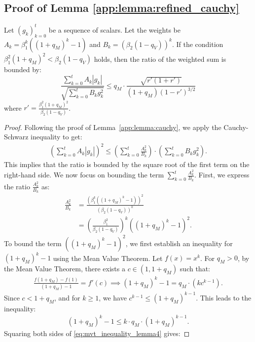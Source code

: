 \documentclass[11pt, letterpaper]{article}
\begin{document}
\subsection{Proof of Lemma \ref{app:lemma:refined_cauchy}}
\begin{lemma}
\label{app:lemma:refined_cauchy}
Let \((g_k)_{k=0}^t\) be a sequence of scalars. Let the weights be $A_k = \beta_1^k((1+q_M)^k - 1)$ and $B_k = (\beta_2(1-q_V))^k$.
If the condition $\beta_1^2(1+q_M)^2 < \beta_2(1-q_V)$ holds, then the ratio of the weighted sum is bounded by:
$$ \frac{\sum_{k=0}^{t} A_k |g_k|}{\sqrt{\sum_{k=0}^{t} B_k g_k^2}} \le q_M \cdot \frac{\sqrt{r'(1+r')}}{(1+q_M)(1-r')^{3/2}} $$
where $r' = \frac{\beta_1^2(1+q_M)^2}{\beta_2(1-q_V)}$.
\end{lemma}
\begin{proof}
Following the proof of Lemma~\ref{app:lemma:cauchy}, we apply the Cauchy-Schwarz inequality to get:
\begin{align}
\left(\sum_{k=0}^{t} A_k |g_k|\right)^2 \le \left( \sum_{k=0}^{t} \frac{A_k^2}{B_k} \right) \cdot \left( \sum_{k=0}^{t} B_k g_k^2 \right). \label{eq:cauchy_applied_lemma4}
\end{align}
This implies that the ratio is bounded by the square root of the first term on the right-hand side. We now focus on bounding the term $\sum_{k=0}^{t} \frac{A_k^2}{B_k}$. First, we express the ratio $\frac{A_k^2}{B_k}$ as:
\begin{align}
\frac{A_k^2}{B_k} &= \frac{(\beta_1^k((1+q_M)^k - 1))^2}{(\beta_2(1-q_V))^k} \nonumber \\
&= \left(\frac{\beta_1^2}{\beta_2(1-q_V)}\right)^k ((1+q_M)^k-1)^2. \label{eq:ak_bk_ratio_lemma4}
\end{align}
To bound the term $((1+q_M)^k-1)^2$, we first establish an inequality for $(1+q_M)^k-1$ using the Mean Value Theorem. Let $f(x) = x^k$. For $q_M > 0$, by the Mean Value Theorem, there exists a $c \in (1, 1+q_M)$ such that:
\begin{align}
\frac{f(1+q_M) - f(1)}{(1+q_M)-1} = f'(c) \implies (1+q_M)^k - 1 = q_M \cdot (k c^{k-1}). \label{eq:mvt_raw_lemma4}
\end{align}
Since $c < 1+q_M$, and for $k \ge 1$, we have $c^{k-1} \le (1+q_M)^{k-1}$. This leads to the inequality:
\begin{align}
(1+q_M)^k - 1 \le k \cdot q_M \cdot (1+q_M)^{k-1}. \label{eq:mvt_inequality_lemma4}
\end{align}
Squaring both sides of \eqref{eq:mvt_inequality_lemma4} gives:

\end{proof}
\end{document}
